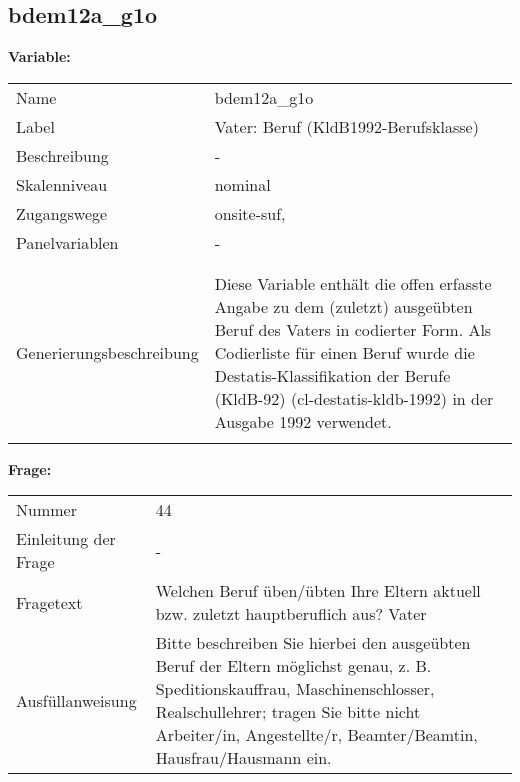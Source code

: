 	
	
	\subsection{bdem12a\_g1o}
	\label{subSection:bdem12a_g1o}

	\noindent\textbf{Variable:}\\
		\begin{tabular}{lL{11.3cm}}
			\label{tableVariable:bdem12a_g1o}
			Name & bdem12a\_g1o \\
			Label & Vater: Beruf (KldB1992-Berufsklasse) \\
			Beschreibung & - \\
			Skalenniveau & nominal \\
			Zugangswege &
				onsite-suf,
 \\
			Panelvariablen & -
			 \\
			 \\
 \\
					Generierungsbeschreibung & Diese Variable enthält die offen erfasste Angabe zu dem (zuletzt) ausgeübten Beruf des Vaters in codierter Form. Als Codierliste für einen Beruf wurde die Destatis-Klassifikation der Berufe (KldB-92) (cl-destatis-kldb-1992) in der Ausgabe 1992 verwendet. 
				 \\	
			 \\
		\end{tabular}

		\vspace*{1 cm}
		\noindent\textbf{Frage:}\\
		\begin{tabular}{lL{11.3cm}}
			\label{tableQuestion:bdem12a_g1o}
			Nummer & 44 \\
			Einleitung der Frage & - \\
			Fragetext & Welchen Beruf üben/übten Ihre Eltern aktuell bzw. zuletzt hauptberuflich aus?
Vater \\
			Ausfüllanweisung & Bitte beschreiben Sie hierbei den ausgeübten Beruf der Eltern möglichst genau, z. B. Speditionskauffrau, Maschinenschlosser, Realschullehrer; tragen Sie bitte nicht Arbeiter/in, Angestellte/r, Beamter/Beamtin, Hausfrau/Hausmann ein. \\
		\end{tabular}





